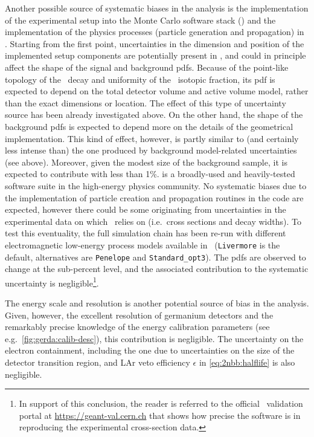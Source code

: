 \begin{description}[wide]
  \item[\mage\ and \geant{}] Another possible source of systematic biases in the analysis
    is the implementation of the experimental setup into the Monte Carlo software stack
    (\mage) and the implementation of the physics processes (particle generation and
    propagation) in \geant. Starting from the first point, uncertainties in the dimension
    and position of the implemented setup components are potentially present in \mage, and
    could in principle affect the shape of the signal and background pdfs. Because of the
    point-like topology of the \nnbb\ decay and uniformity of the \gesix\ isotopic
    fraction, its pdf is expected to depend on the total detector volume and active volume
    model, rather than the exact dimensions or location. The effect of this type of
    uncertainty source has been already investigated above. On the other hand, the shape
    of the background pdfs is expected to depend more on the details of the geometrical
    implementation. This kind of effect, however, is partly similar to (and certainly less
    intense than) the one produced by background model-related uncertainties (see above).
    Moreover, given the modest size of the background sample, it is expected to contribute
    with less than 1\%.
    \newpar
    \geant{} is a broadly-used and heavily-tested software suite in the high-energy
    physics community. No systematic biases due to the implementation of particle creation
    and propagation routines in the code are expected, however there could be some
    originating from uncertainties in the experimental data on which \geant\ relies on
    (i.e.~cross sections and decay widths). To test this eventuality, the full simulation
    chain has been re-run with different electromagnetic low-energy process models
    available in \geant\ (\texttt{Livermore} is the default, alternatives are
    \texttt{Penelope} and \texttt{Standard\_opt3}). The pdfs are observed to change at the
    sub-percent level, and the associated contribution to the systematic uncertainty is
    negligible\footnote{%
      In support of this conclusion, the reader is referred to the official \geant\
      validation portal at \url{https://geant-val.cern.ch} that shows how precise the
      software is in reproducing the experimental cross-section data. 
    }.

  \item[Other sources] The energy scale and resolution is another potential source of
    bias in the analysis. Given, however, the excellent resolution of germanium detectors
    and the remarkably precise knowledge of the energy calibration parameters (see
    e.g.~\cref{fig:gerda:calib-desc}), this contribution is negligible. The uncertainty on
    the electron containment, including the one due to uncertainties on the size of the
    detector transition region, and LAr veto efficiency $\epsilon$ in \cref{eq:2nbb:halflife}
    is also negligible.

\end{description}

